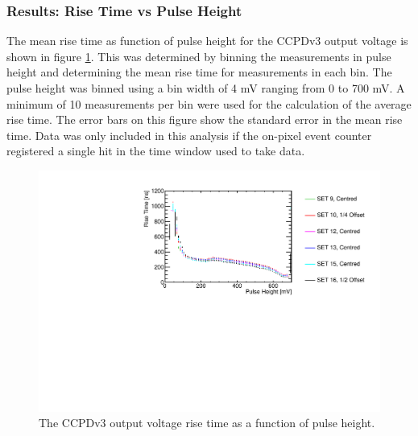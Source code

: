 \subsubsection{Results: Rise Time vs Pulse Height}
\label{sec:resultsrisetimepulseheight}
The mean rise time as function of pulse height for the CCPDv3 output voltage is shown in figure \ref{fig:risetime}.  This was determined by binning the measurements in pulse height and determining the mean rise time for measurements in each bin.  The pulse height was binned using a bin width of 4 mV ranging from 0 to 700 mV.  A minimum of 10 measurements per bin were used for the calculation of the average rise time.  The error bars on this figure show the standard error in the mean rise time.  Data was only included in this analysis if the on-pixel event counter registered a single hit in the time window used to take data.

\begin{figure}[h!]
\centering
\includegraphics[width=1.0\textwidth]{CLICdpVertex/Plots/RadSourceAnalysis/AllSETs_RiseTime_PulseHeight.pdf}
\caption[The CCPDv3 output voltage rise time as a function of pulse height.]{The CCPDv3 output voltage rise time as a function of pulse height.}
\label{fig:risetime}
\end{figure}
 
